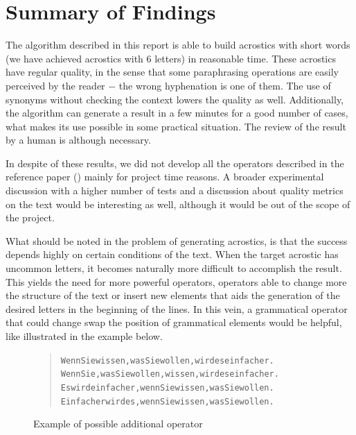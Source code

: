 \documentclass[11pt]{reportAlternative}
\begin{document}
\chapter{Summary of Findings}
The algorithm described in this report is able to build acrostics with short words (we have achieved acrostics with 6 letters) in reasonable time. These acrostics have regular quality, in the sense that some paraphrasing operations are easily perceived by the reader $-$ the wrong hyphenation is one of them. The use of synonyms without checking the context lowers the quality as well. Additionally, the algorithm can generate a result in a few minutes for a good number of cases, what makes its use possible in some practical situation. The review of the result by a human is although necessary. \par

In despite of these results, we did not develop all the operators described in the reference paper (\cite{Stein}) mainly for project time reasons. A broader experimental discussion with a higher number of tests and a discussion about quality metrics on the text would be interesting as well, although it would be out of the scope of the project. \par

What should be noted in the problem of generating acrostics, is that the success depends highly on certain conditions of the text. When the target acrostic has uncommon letters, it becomes naturally more difficult to accomplish the result. This yields the need for more powerful operators, operators able to change more the structure of the text or insert new elements that aids the generation of the desired letters in the beginning of the lines. In this vein, a grammatical operator that could change swap the position of grammatical elements would be helpful, like illustrated in the example below. \par

\begin{figure}[H]
\begin{quote}
\begin{alltt}
Wenn Sie wissen, was Sie wollen, wird es einfacher.
Wenn Sie, was Sie wollen, wissen, wird es einfacher.
Es wird einfacher, wenn Sie wissen, was Sie wollen.
Einfacher wird es, wenn Sie wissen, was Sie wollen.
\end{alltt}
\end{quote}
\caption{Example of possible additional operator}
\end{figure}
\end{document}
